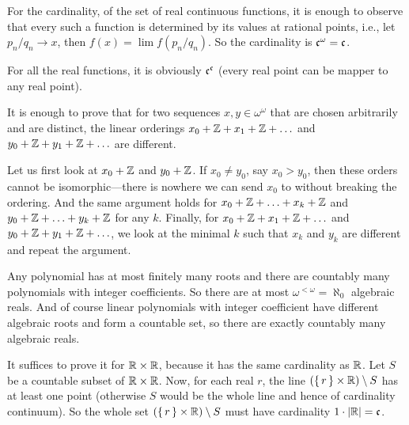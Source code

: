 \documentclass[12pt]{article}
\theoremstyle{definition}
\newenvironment{customthm}[1]
  {\renewcommand\theinnercustomthm{#1}\innercustomthm}
  {\endinnercustomthm}
\begin{document}
\begin{customthm}{I.3.16}
    
\end{customthm}

\begin{customthm}{I.4.1}
    For the cardinality, of the set of real continuous functions, it is enough to observe that every such a function is determined by its values at rational points, i.e., let $p_n/q_n \to x$, then $f(x) = \lim f(p_n/q_n)$. So the cardinality is $\mathfrak{c}^\omega = \mathfrak{c}$.
    
    For all the real functions, it is obviously $\mathfrak{c}^{\mathfrak{c}}$ (every real point can be mapper to any real point).
\end{customthm}

\begin{customthm}{I.4.2}
    It is enough to prove that for two sequences $x,y \in \omega^\omega$ that are chosen arbitrarily and are distinct, the linear orderings $x_0 + {\mathbb Z} + x_1 + {\mathbb Z} + \ldots$ and $y_0 + {\mathbb Z} + y_1 + {\mathbb Z} + \ldots$ are different.
    
    Let us first look at $x_0 + {\mathbb Z}$ and $y_0 + {\mathbb Z}$. If $x_0 \neq y_0$, say $x_0>y_0$, then these orders cannot be isomorphic---there is nowhere we can send $x_0$ to without breaking the ordering. And the same argument holds for $x_0 + {\mathbb Z} + \ldots + x_k + {\mathbb Z}$ and $y_0 + {\mathbb Z} + \ldots + y_k + {\mathbb Z}$ for any $k$. Finally, for $x_0 + {\mathbb Z} + x_1 + {\mathbb Z} + \ldots$ and $y_0 + {\mathbb Z} + y_1 + {\mathbb Z} + \ldots$, we look at the minimal $k$ such that $x_k$ and $y_k$ are different and repeat the argument.
\end{customthm}

\begin{customthm}{I.4.3}
    Any polynomial has at most finitely many roots and there are countably many polynomials with integer coefficients. So there are at most $\omega^{<\omega} = \aleph_0$ algebraic reals. And of course linear polynomials with integer coefficient have different algebraic roots and form a countable set, so there are exactly countably many algebraic reals.
\end{customthm}

\begin{customthm}{I.4.4}
    It suffices to prove it for ${\mathbb R} \times {\mathbb R}$, because it has the same cardinality as ${\mathbb R}$. Let $S$ be a countable subset of ${\mathbb R} \times {\mathbb R}$. Now, for each real $r$, the line $(\{\,{r}\,\} \times {\mathbb R}) \setminus S$ has at least one point (otherwise $S$ would be the whole line and hence of cardinality continuum). So the whole set $(\{\,{r}\,\} \times {\mathbb R}) \setminus S$ must have cardinality $1 \cdot |{\mathbb R}| = \mathfrak{c}$.
\end{customthm}
\end{document}
